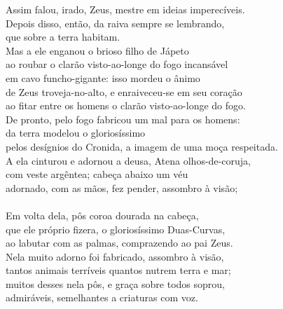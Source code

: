 \begin{pages}
\begin{Rightside}
\quad{}Assim falou, irado, Zeus, mestre em ideias imperecíveis.\\
Depois disso, então, da raiva sempre se lembrando,\\
 que sobre a terra habitam.\\
Mas a ele enganou o brioso filho de Jápeto \\
ao roubar o clarão visto-ao-longe do fogo incansável\\
em cavo funcho-gigante: isso mordeu o ânimo\\
de Zeus troveja-no-alto, e enraiveceu-se em seu coração\\
ao fitar entre os homens o clarão visto-ao-longe do fogo.\\
De pronto, pelo fogo fabricou um mal para os homens: \\
da terra modelou o gloriosíssimo \\
pelos desígnios do Cronida, a imagem de uma moça respeitada.\\
A ela cinturou e adornou a deusa, Atena olhos-de-coruja,\\
com veste argêntea; cabeça abaixo um véu\\
adornado, com as mãos, fez pender, assombro à visão; \\
\\
Em volta dela, pôs coroa dourada na cabeça,\\
que ele próprio fizera, o gloriosíssimo Duas-Curvas,\\
ao labutar com as palmas, comprazendo ao pai Zeus. \\
Nela muito adorno foi fabricado, assombro à visão,\\
tantos animais terríveis quantos nutrem terra e mar;\\
muitos desses nela pôs, e graça sobre todos soprou,\\
admiráveis, semelhantes a criaturas com voz.\\


\end{Rightside}
\end{pages}
